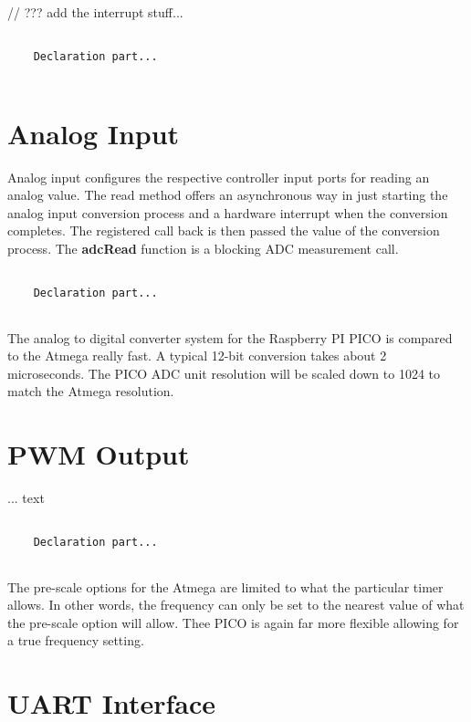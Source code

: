 // ??? add the interrupt stuff...

\lstset{language=c++, style=codesnippetstyle}
\begin{lstlisting}
   
    Declaration part...
    
\end{lstlisting}
\FloatBarrier

\section{Analog Input}

Analog input configures the respective controller input ports for reading an analog value. The read method offers an asynchronous way in just starting the analog input conversion process and a hardware interrupt when the conversion completes. The registered call back is then passed the value of the conversion process. The \textbf{adcRead} function is a blocking ADC measurement call.

\lstset{language=c++, style=codesnippetstyle}
\begin{lstlisting}
   
    Declaration part...
    
\end{lstlisting}
\FloatBarrier

The analog to digital converter system for the Raspberry PI PICO is compared to the Atmega really fast. A typical 12-bit conversion takes about 2 microseconds. The PICO ADC unit resolution will be scaled down to 1024 to match the Atmega resolution.

\section{PWM Output}

... text

\lstset{language=c++, style=codesnippetstyle}
\begin{lstlisting}
   
    Declaration part...
    
\end{lstlisting}
\FloatBarrier

The pre-scale options for the Atmega are limited to what the particular timer allows. In other words, the frequency can only be set to the nearest value of what the pre-scale option will allow. Thee PICO is again far more flexible allowing for a true frequency setting.

\section{UART Interface}

